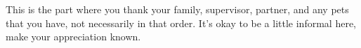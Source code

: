 \cleardoublepage{}
\renewcommand*{\thefootnote}{\fnsymbol{footnote}}
\begin{center}
	
	This is the part where you thank your family, supervisor, partner, and any pets that you have, not necessarily in that order. 
	It's okay to be a little informal here, make your appreciation known.
	
\end{center}
\cleardoublepage{}
